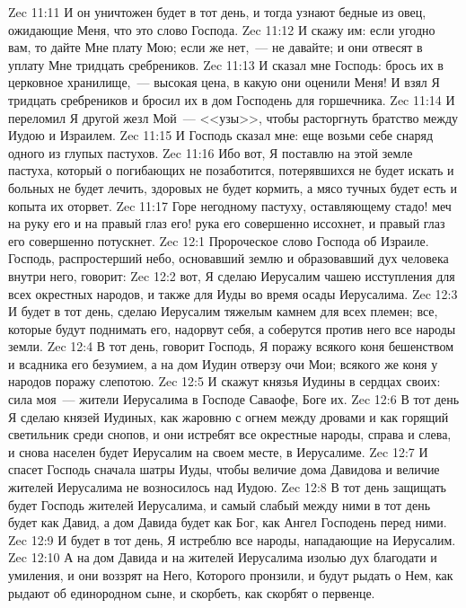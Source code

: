 \vs Zec 11:11 И он уничтожен будет в тот день, и тогда узнают бедные из овец, ожидающие Меня, что это слово Господа.
\vs Zec 11:12 И скажу им: если угодно вам, то дайте Мне плату Мою; если же нет,~--- не давайте; и они отвесят в уплату Мне тридцать сребреников.
\vs Zec 11:13 И сказал мне Господь: брось их в церковное хранилище,~--- высокая цена, в какую они оценили Меня! И взял Я тридцать сребреников и бросил их в дом Господень для горшечника.
\vs Zec 11:14 И переломил Я другой жезл Мой~--- <<узы>>, чтобы расторгнуть братство между Иудою и Израилем.
\vs Zec 11:15 И Господь сказал мне: еще возьми себе снаряд одного из глупых пастухов.
\vs Zec 11:16 Ибо вот, Я поставлю на этой земле пастуха, который о погибающих не позаботится, потерявшихся не будет искать и больных не будет лечить, здоровых не будет кормить, а мясо тучных будет есть и копыта их оторвет.
\vs Zec 11:17 Горе негодному пастуху, оставляющему стадо! меч на руку его и на правый глаз его! рука его совершенно иссохнет, и правый глаз его совершенно потускнет.
\vs Zec 12:1 Пророческое слово Господа об Израиле. Господь, распростерший небо, основавший землю и образовавший дух человека внутри него, говорит:
\vs Zec 12:2 вот, Я сделаю Иерусалим чашею исступления для всех окрестных народов, и также для Иуды во время осады Иерусалима.
\vs Zec 12:3 И будет в тот день, сделаю Иерусалим тяжелым камнем для всех племен; все, которые будут поднимать его, надорвут себя, а соберутся против него все народы земли.
\vs Zec 12:4 В тот день, говорит Господь, Я поражу всякого коня бешенством и всадника его безумием, а на дом Иудин отверзу очи Мои; всякого же коня у народов поражу слепотою.
\vs Zec 12:5 И скажут князья Иудины в сердцах своих: сила моя~--- жители Иерусалима в Господе Саваофе, Боге их.
\vs Zec 12:6 В тот день Я сделаю князей Иудиных, как жаровню с огнем между дровами и как горящий светильник среди снопов, и они истребят все окрестные народы, справа и слева, и снова населен будет Иерусалим на своем месте, в Иерусалиме.
\vs Zec 12:7 И спасет Господь сначала шатры Иуды, чтобы величие дома Давидова и величие жителей Иерусалима не возносилось над Иудою.
\vs Zec 12:8 В тот день защищать будет Господь жителей Иерусалима, и самый слабый между ними в тот день будет как Давид, а дом Давида будет как Бог, как Ангел Господень перед ними.
\vs Zec 12:9 И будет в тот день, Я истреблю все народы, нападающие на Иерусалим.
\vs Zec 12:10 А на дом Давида и на жителей Иерусалима изолью дух благодати и умиления, и они воззрят на Него, Которого пронзили, и будут рыдать о Нем, как рыдают об единородном сыне, и скорбеть, как скорбят о первенце.
